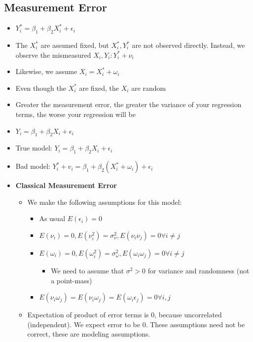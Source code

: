 \documentclass[10pt, oneside]{article}
\begin{document}
\subsection{Measurement Error}
\begin{itemize}
    \item $Y_i^* = \beta_1 + \beta_2 X_i ^* +\epsilon_i$
    \item The $X_i ^*$ are assumed fixed, but $X_i ^*, Y_i ^*$ are not observed directly. Instead, we observe the mismeasured $X_i, Y_i: Y_i^* + \nu_i$
    \item Likewise, we assume $X_i = X_i ^* + \omega_i$
    \item Even though the $X_i^*$ are fixed, the $X_i$ are random
    \item Greater the measurement error, the greater the variance of your regression terms, the worse your regression will be
    \item $Y_i = \beta_1 + \beta_2 X_i + \epsilon_i$
    \item True model: $Y_i = \beta_1 + \beta_2 X_i + \epsilon_i$
    \item Bad model: $Y_i^* + v_i = \beta_1 + \beta_2 (X_i ^* + \omega_i) + \epsilon_i$
    \item \textbf{Classical Measurement Error}
    \begin{itemize}
        \item We make the following assumptions for this model:
        \begin{itemize}
            \item As usual $E(\epsilon_i) = 0$
            \item $E(\nu_i)=0, E(\nu_i^2) = \sigma^2 _\nu, E(\nu_i \nu_j) = 0\forall i\neq j$
            \item $E(\omega_i) = 0, E(\omega_i ^2) = \sigma^2_\omega, E(\omega_i\omega_j) = 0\forall i\neq j$
            \begin{itemize}
                \item We need to assume that $\sigma^2 > 0$ for variance and randomness (not a point-mass)
            \end{itemize}
            \item $E(\nu_i\omega_j) = E(\nu_i \omega_j) = E(\omega_i \epsilon_j) = 0\forall i,j$
        \end{itemize}
        \item Expectation of product of error terms is 0, because uncorrelated (independent). We expect error to be 0. These assumptions need not be correct, these are modeling assumptions.

\end{itemize}
\end{itemize}
\end{document}
